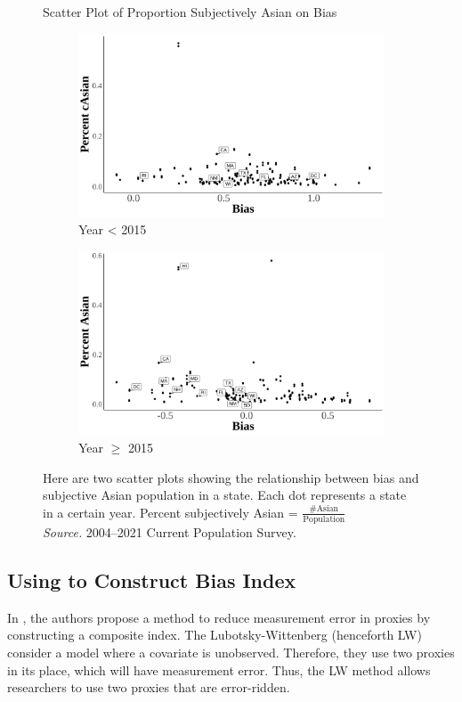 \begin{figure}[H]
    \centering
    \caption{Scatter Plot of Proportion Subjectively Asian on Bias}
    \label{scatter-plot-1}
    \begin{subfigure}{.9\textwidth}
    \caption{Year < 2015}
    \centering
    \includegraphics[width=.9\linewidth]{scatter-plot-bias-Asian-less2015.png}
    \end{subfigure}
    \centering
    \begin{subfigure}{.9\textwidth}
    \caption{Year $\geq$ 2015}
    \centering
    \includegraphics[width=.9\linewidth]{scatter-plot-bias-Asian-great2015.png}
    \end{subfigure}
    \caption*{\footnotesize{Here are two scatter plots showing the relationship between bias and subjective Asian population in a state. Each dot represents a state in a certain year. Percent subjectively Asian = $\frac{\# \text{Asian}}{\text{Population}}$ \\
    \emph{Source.} 2004--2021 Current Population Survey.}}
    \end{figure}

    
\subsection*{Using \textcite{lubotskyInterpretationRegressionsMultiple2006} to Construct Bias Index} %
\label{sub:lw-bias}
In \textcite{lubotskyInterpretationRegressionsMultiple2006}, the authors propose a method to reduce measurement error in proxies by constructing a composite index. The Lubotsky-Wittenberg (henceforth LW) consider a model where a covariate is unobserved. Therefore, they use two proxies in its place, which will have measurement error. Thus, the LW method allows researchers to use two proxies that are error-ridden. 


